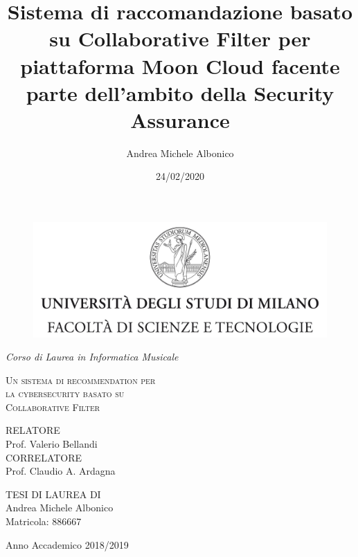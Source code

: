 \documentclass[12pt, fleqn, twoside, a4paper]{book}
\title{Sistema di raccomandazione basato su Collaborative Filter per piattaforma Moon Cloud 
facente parte dell'ambito della Security Assurance}
\author{Andrea Michele Albonico}
\date{24/02/2020}
\begin{document}
\frontmatter

\begin{titlepage}
    \begin{center}
        \begin{figure}
            \centering
            \includegraphics[height=5.0 cm]{logo}
        \end{figure}
        \vspace{.2 cm}
        {\Large
            \emph{Corso di Laurea in Informatica Musicale}
        }
        \vfill
        \begin{LARGE}
            \textsc{Un sistema di recommendation per\\[-0.2 cm]
            la cybersecurity basato su\\[.2 cm]
            Collaborative Filter}
        \end{LARGE}
        \vfill
        \begin{flushleft}
            {\large
                RELATORE\\[.3 cm] Prof. Valerio Bellandi\\[1 cm]
                \noindent CORRELATORE\\[.3 cm] Prof. Claudio A. Ardagna
            }
        \end{flushleft}
        \vfill
        \begin{flushright}
            {\large TESI DI LAUREA DI\\[.3cm] Andrea Michele Albonico\\[.15cm] Matricola: 886667}
        \end{flushright}
        \vfill
        {\Large Anno Accademico 2018/2019}
    \end{center}
\end{titlepage}

\break




\end{document}
